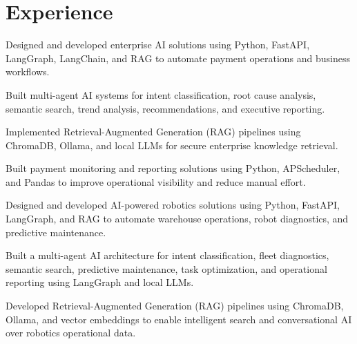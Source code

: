 \documentclass[letterpaper]{deedy-resume} %
\begin{document}
\hfill
%
%
\begin{minipage}[t]{0.66\textwidth} %

\section{Experience}

\sectionspace
\begin{tightitemize}
\item Designed and developed enterprise AI solutions using Python, FastAPI, LangGraph, LangChain, and RAG to automate payment operations and business workflows.
\item Built multi-agent AI systems for intent classification, root cause analysis, semantic search, trend analysis, recommendations, and executive reporting.
\item Implemented Retrieval-Augmented Generation (RAG) pipelines using ChromaDB, Ollama, and local LLMs for secure enterprise knowledge retrieval.
\item Built payment monitoring and reporting solutions using Python, APScheduler, and Pandas to improve operational visibility and reduce manual effort.
\end{tightitemize}

\begin{tightitemize}
\item Designed and developed AI-powered robotics solutions using Python, FastAPI, LangGraph, and RAG to automate warehouse operations, robot diagnostics, and predictive maintenance.
\item Built a multi-agent AI architecture for intent classification, fleet diagnostics, semantic search, predictive maintenance, task optimization, and operational reporting using LangGraph and local LLMs.
\item Developed Retrieval-Augmented Generation (RAG) pipelines using ChromaDB, Ollama, and vector embeddings to enable intelligent search and conversational AI over robotics operational data.
\end{tightitemize}



\end{minipage}
\end{document}
